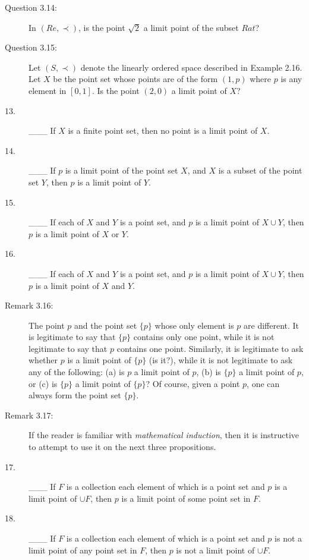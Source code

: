 \documentclass{book}
\begin{document}
\begin{description}
\item[Question 3.14:] In $(Re, \prec)$, is the point $\sqrt{2}$ a limit point of the subset $Rat$?

\item[Question 3.15:] Let $(S, \prec)$ denote the linearly ordered space described in Example 2.16. Let $X$ be the point set whose points are of the form $(1,p)$ where $p$ is any element in $[0,1]$. Is the point $(2,0)$ a limit point of $X$?

\item[13.] \_\_\_ If $X$ is a finite point set, then no point is a limit point of $X$.

\item[14.] \_\_\_ If $p$ is a limit point of the point set $X$, and $X$ is a subset of the point set $Y$, then $p$ is a limit point of $Y$.

\item[15.] \_\_\_ If each of $X$ and $Y$ is a point set, and $p$ is a limit point of $X \cup Y$, then $p$ is a limit point of $X$ or $Y$.

\item[16.] \_\_\_ If each of $X$ and $Y$ is a point set, and $p$ is a limit point of $X \cup Y$, then $p$ is a limit point of $X$ and $Y$.

\item[Remark 3.16:] The point $p$ and the point set $\{ p \}$ whose only element is $p$ are different. It is legitimate to say that $\{ p \}$ contains only one point, while it is not legitimate to say that $p$ contains one point. Similarly, it is legitimate to ask whether $p$ is a limit point of $\{ p \}$ (is it?), while it is not legitimate to ask any of the following: (a) is $p$ a limit point of $p$, (b) is $\{ p \}$ a limit point of $p$, or (c) is $\{ p \}$ a limit point of $\{ p \}$? Of course, given a point $p$, one can always form the point set $\{ p \}$.

\item[Remark 3.17:] If the reader is familiar with \emph{mathematical induction}, then it is instructive to attempt to use it on the next three propositions.

\item[17.] \_\_\_ If $F$ is a collection each element of which is a point set and $p$ is a limit point of $\cup F$, then $p$ is a limit point of some point set in $F$.

\item[18.] \_\_\_ If $F$ is a collection each element of which is a point set and $p$ is not a limit point of any point set in $F$, then $p$ is not a limit point of $\cup F$.


\end{description}
\end{document}
